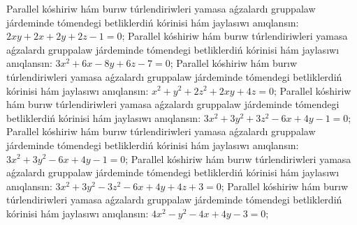 Parallel kóshiriw hám burıw túrlendiriwleri yamasa aǵzalardı gruppalaw járdeminde tómendegi betliklerdiń kórinisi hám jaylasıwı anıqlansın: $2 x y+2 x+2 y+2 z-1=0$;
Parallel kóshiriw hám burıw túrlendiriwleri yamasa aǵzalardı gruppalaw járdeminde tómendegi betliklerdiń kórinisi hám jaylasıwı anıqlansın: $3 x^2+6 x-8 y+6 z-7=0$;
Parallel kóshiriw hám burıw túrlendiriwleri yamasa aǵzalardı gruppalaw járdeminde tómendegi betliklerdiń kórinisi hám jaylasıwı anıqlansın: $x^2+y^2+2 z^2+2 x y+4 z=0$;
Parallel kóshiriw hám burıw túrlendiriwleri yamasa aǵzalardı gruppalaw járdeminde tómendegi betliklerdiń kórinisi hám jaylasıwı anıqlansın: $3 x^2+3 y^2+3 z^2-6 x+4 y-1=0$;
Parallel kóshiriw hám burıw túrlendiriwleri yamasa aǵzalardı gruppalaw járdeminde tómendegi betliklerdiń kórinisi hám jaylasıwı anıqlansın: $3 x^2+3 y^2-6 x+4 y-1=0$;
Parallel kóshiriw hám burıw túrlendiriwleri yamasa aǵzalardı gruppalaw járdeminde tómendegi betliklerdiń kórinisi hám jaylasıwı anıqlansın: $3 x^2+3 y^2-3 z^2-6 x+4 y+4 z+3=0$;
Parallel kóshiriw hám burıw túrlendiriwleri yamasa aǵzalardı gruppalaw járdeminde tómendegi betliklerdiń kórinisi hám jaylasıwı anıqlansın: $4 x^2-y^2-4 x+4 y-3=0$;
